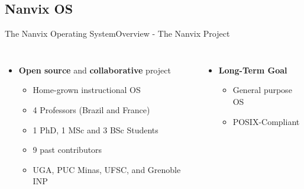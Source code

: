 

	\subsection{Nanvix OS}

		\begin{frame}[fragile]{The Nanvix Operating System}{Overview - The Nanvix Project}

		\begin{columns}[totalwidth=\linewidth]


			\begin{columns}[totalwidth=\linewidth]

					\begin{itemize}
						\item \textbf{Open source} and \textbf{collaborative} project
						\begin{itemize}
							\item Home-grown instructional OS
							\item 4 Professors (Brazil and France)
							\item 1 PhD, 1 MSc and 3 BSc Students
							\item 9 past contributors
							\item UGA, PUC Minas, UFSC, and Grenoble INP
						\end{itemize}
					\end{itemize}

			\end{columns} 

			\vspace{.5cm}

			\begin{columns}[totalwidth=\linewidth]

					\begin{itemize}
						\item \textbf{Long-Term Goal}
						\begin{itemize}
							\item General purpose OS
							\item POSIX-Compliant
						\end{itemize}
					\end{itemize}


\end{columns}
\end{columns}
\end{frame}

